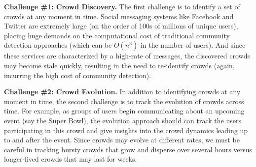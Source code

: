 \documentclass{sig-alternate}
\begin{document}
\textbf{Challenge \#1: Crowd Discovery.}  The first challenge is to identify a set of crowds at any moment in time. Social messaging systems like Facebook and Twitter are extremely large (on the order of 100s of millions of unique users), placing huge demands on the computational cost of traditional community detection approaches (which can be $O(n^3)$ in the number of users). And since these services are characterized by a
high-rate of messages, the discovered crowds may become stale quickly, resulting in the need to re-identify crowds (again, incurring the high cost of community detection).


\textbf{Challenge \#2: Crowd Evolution.} In addition to identifying crowds at any moment in time, the second challenge is to track the evolution of crowds across time. For example, as groups of users begin communicating about an upcoming event (say the Super Bowl), the evolution approach should can track the users participating in this crowd and give
insights into the crowd dynamics leading up to and after the event. Since crowds may evolve at different rates, we must be careful in tracking bursty crowds that grow and disperse over several hours versus longer-lived crowds that may last for weeks.











\end{document}
